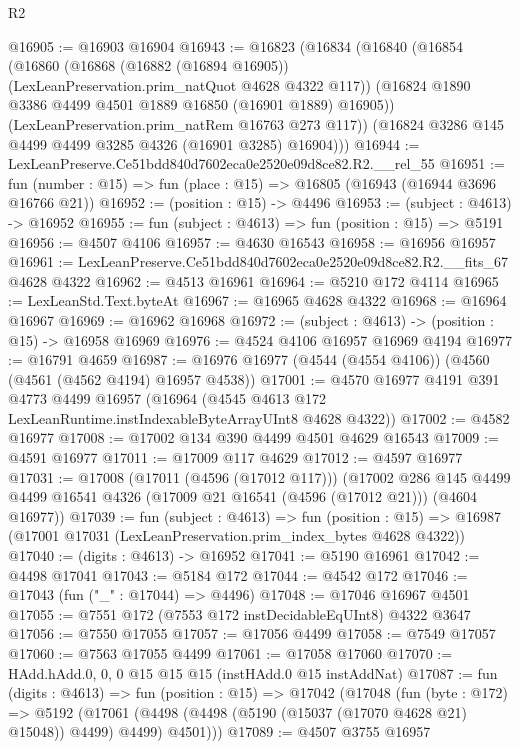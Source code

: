 \begin{lexlean}{R2}
\begin{coremodule}
@16905 := @16903 @16904
@16943 := @16823
    (@16834
      (@16840
        (@16854
          (@16860
            (@16868 (@16882 (@16894 @16905)) (LexLeanPreservation.prim_natQuot @4628 @4322 @117))
            (@16824 @1890 @3386 @4499 @4501 @1889 @16850 (@16901 @1889) @16905))
          (LexLeanPreservation.prim_natRem @16763 @273 @117))
        (@16824 @3286 @145 @4499 @4499 @3285 @4326 (@16901 @3285) @16904)))
@16944 := LexLeanPreserve.Ce51bdd840d7602eca0e2520e09d8ce82.R2.__rel_55
@16951 := fun (number : @15) => fun (place : @15) => @16805 (@16943 (@16944 @3696 @16766 @21))
@16952 := (position : @15) -> @4496
@16953 := (subject : @4613) -> @16952
@16955 := fun (subject : @4613) => fun (position : @15) => @5191
@16956 := @4507 @4106
@16957 := @4630 @16543
@16958 := @16956 @16957
@16961 := LexLeanPreserve.Ce51bdd840d7602eca0e2520e09d8ce82.R2.__fits_67 @4628 @4322
@16962 := @4513 @16961
@16964 := @5210 @172 @4114
@16965 := LexLeanStd.Text.byteAt
@16967 := @16965 @4628 @4322
@16968 := @16964 @16967
@16969 := @16962 @16968
@16972 := (subject : @4613) -> (position : @15) -> @16958 @16969
@16976 := @4524 @4106 @16957 @16969 @4194
@16977 := @16791 @4659
@16987 := @16976 @16977 (@4544 (@4554 @4106)) (@4560 (@4561 (@4562 @4194) @16957 @4538))
@17001 := @4570
    @16977
    @4191
    @391
    @4773
    @4499
    @16957
    (@16964 (@4545 @4613 @172 LexLeanRuntime.instIndexableByteArrayUInt8 @4628 @4322))
@17002 := @4582 @16977
@17008 := @17002 @134 @390 @4499 @4501 @4629 @16543
@17009 := @4591 @16977
@17011 := @17009 @117 @4629
@17012 := @4597 @16977
@17031 := @17008
    (@17011 (@4596 (@17012 @117)))
    (@17002
      @286
      @145
      @4499
      @4499
      @16541
      @4326
      (@17009 @21 @16541 (@4596 (@17012 @21)))
      (@4604 @16977))
@17039 := fun (subject : @4613) =>
  fun (position : @15) => @16987 (@17001 @17031 (LexLeanPreservation.prim_index_bytes @4628 @4322))
@17040 := (digits : @4613) -> @16952
@17041 := @5190 @16961
@17042 := @4498 @17041
@17043 := @5184 @172
@17044 := @4542 @172
@17046 := @17043 (fun ("_" : @17044) => @4496)
@17048 := @17046 @16967 @4501
@17055 := @7551 @172 (@7553 @172 instDecidableEqUInt8) @4322 @3647
@17056 := @7550 @17055
@17057 := @17056 @4499
@17058 := @7549 @17057
@17060 := @7563 @17055 @4499
@17061 := @17058 @17060
@17070 := HAdd.hAdd.{0, 0, 0} @15 @15 @15 (instHAdd.{0} @15 instAddNat)
@17087 := fun (digits : @4613) =>
  fun (position : @15) =>
  @17042
    (@17048
      (fun (byte : @172) =>
      @5192 (@17061 (@4498 (@4498 (@5190 (@15037 (@17070 @4628 @21) @15048)) @4499) @4499) @4501)))
@17089 := @4507 @3755 @16957

\end{coremodule}
\end{lexlean}
